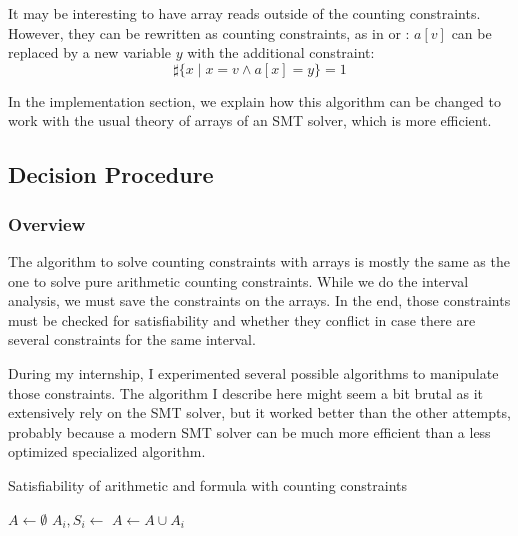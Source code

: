 \documentclass[]{article}
\begin{document}
{It may be interesting to have array reads outside of the counting
constraints. However, they can be rewritten as counting constraints, as in
\cite{bradley2006s} or
\cite{AlbertiGP16}: $a[v]$ can be replaced by a new variable $y$ with the additional constraint:
\begin{equation}
\sharp\{x\mid x = v \land a[x] = y\} = 1
\end{equation}

In the implementation section, we explain
how this algorithm can be changed to work with the usual theory of arrays of an
SMT solver, which is more efficient.

\subsection{Decision Procedure}

\subsubsection{Overview}

The algorithm to solve counting constraints with arrays is mostly the
same as the one to solve pure arithmetic counting constraints. While we do the interval analysis,
we must save the constraints on the arrays. In the end, those constraints must be checked for
satisfiability and whether they conflict in case there are several constraints for the same interval.

During my internship, I experimented several possible algorithms to
manipulate those constraints. The algorithm I describe here might seem a
bit brutal as it extensively rely on the SMT solver, but it
worked better than the other attempts, probably because a modern SMT
solver can be much more efficient than a less optimized specialized
algorithm.

\begin{algorithm}[h]
\caption{Satisfiability of arithmetic and formula with counting constraints}
\begin{algorithmic}[1]
\State {}
    \State {}
    \State $A \gets \emptyset$
        \State $A_i, S_i \gets $ 
        \State $A \gets A \cup A_i$
            \State {}
            \State {}
        \EndIf
    \EndFor
    \State {}
    \State {}
    \State {}
    \State {}
    \State {}
    \State {}
        \State {}
        \State {}
    \EndIf
    \State {}
    \State {}
\EndWhile
\State {}
\end{algorithmic}
\label{arrayalgo}
\end{algorithm}

}
\end{document}
